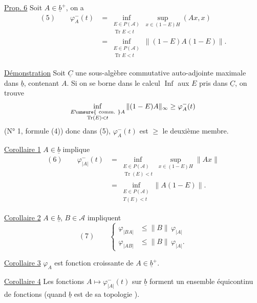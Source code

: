 
\uline{Prop. 6} Soit $A\in\underline b^+$, on a
\[
\begin{aligned}
(5)\qquad \varphi_A^-(t)
 &=\inf_{\substack{E\in P(\mathcal A)\\ \operatorname{Tr}E<t}}
       \sup_{x\in(1-E)H}(Ax,x)\\
 &=\inf_{\substack{E\in P(\mathcal A)\\ \operatorname{Tr}E<t}}
       \|(1-E)A(1-E)\|.
\end{aligned}
\]

\uline{Démonstration} Soit $\underline C$  une sous-algèbre commutative auto-adjointe maximale dans $\underline b$, contenant $A$. Si on se borne dans le calcul  $\operatorname{Inf}$ aux $E$ pris dans $\underline C$, on trouve
\[
\inf_{\substack{E\unsure{\mathrm{\ comm.\ }}A\\ \operatorname{Tr}(E)<t}}
\|(1-E)A\|_\infty\geq\varphi_A^-(t)
\]
\margin{$\downarrow$}
(N° 1, formule (4))  donc dans (5), $\varphi_A^-(t)$ est $\geq$ le deuxième membre.

\uline{Corollaire 1} $A\in\underline b$ implique
\[
\begin{aligned}
(6)\qquad \varphi_{|A|}^-(t)
 &=\inf_{\substack{E\in P(\mathcal A)\\ \operatorname{Tr}(E)<t}}
       \sup_{x\in(1-E)H}\|Ax\|\\
 &=\inf_{\substack{E\in P(\mathcal A)\\ T(E)<t}}\|A(1-E)\|.
\end{aligned}
\]

\uline{Corollaire 2} $A\in\underline b$, $B\in\mathcal A$ impliquent
\[
(7)\qquad
\left\{\begin{aligned}
\varphi_{|BA|}&\leq\|B\|\,\varphi_{|A|}\\
\varphi_{|AB|}&\leq\|B\|\,\varphi_{|A|}.
\end{aligned}\right.
\]

\uline{Corollaire 3} $\varphi_A$ est fonction croissante de $A\in\underline b^+$.

\uline{Corollaire 4} Les fonctions $A\longmapsto\varphi_{|A|}^-(t)$ sur $\underline b$ forment un ensemble équicontinu de fonctions (quand $\underline b$ est  de sa topologie ).
\margin{$\Big|$}

